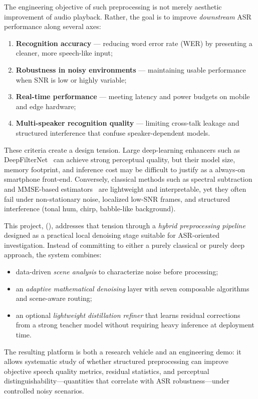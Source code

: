 The engineering objective of such preprocessing is not merely aesthetic improvement of audio playback. Rather, the goal is to improve \emph{downstream} ASR performance along several axes:
\begin{enumerate}
  \item \textbf{Recognition accuracy} --- reducing word error rate (WER) by presenting a cleaner, more speech-like input;
  \item \textbf{Robustness in noisy environments} --- maintaining usable performance when SNR is low or highly variable;
  \item \textbf{Real-time performance} --- meeting latency and power budgets on mobile and edge hardware;
  \item \textbf{Multi-speaker recognition quality} --- limiting cross-talk leakage and structured interference that confuse speaker-dependent models.
\end{enumerate}
These criteria create a design tension. Large deep-learning enhancers such as DeepFilterNet~\cite{deepfilternet2023} can achieve strong perceptual quality, but their model size, memory footprint, and inference cost may be difficult to justify as a always-on smartphone front-end. Conversely, classical methods such as spectral subtraction~\cite{boll1979} and MMSE-based estimators~\cite{ephraim1984} are lightweight and interpretable, yet they often fail under non-stationary noise, localized low-SNR frames, and structured interference (tonal hum, chirp, babble-like background).

This project, \projectshort{} (\projectname{}), addresses that tension through a \emph{hybrid preprocessing pipeline} designed as a practical local denoising stage suitable for ASR-oriented investigation. Instead of committing to either a purely classical or purely deep approach, the system combines:
\begin{itemize}
  \item data-driven \emph{scene analysis} to characterize noise before processing;
  \item an \emph{adaptive mathematical denoising} layer with seven composable algorithms and scene-aware routing;
  \item an optional \emph{lightweight distillation refiner} that learns residual corrections from a strong teacher model without requiring heavy inference at deployment time.
\end{itemize}
The resulting platform is both a research vehicle and an engineering demo: it allows systematic study of whether structured preprocessing can improve objective speech quality metrics, residual statistics, and perceptual distinguishability---quantities that correlate with ASR robustness---under controlled noisy scenarios.

